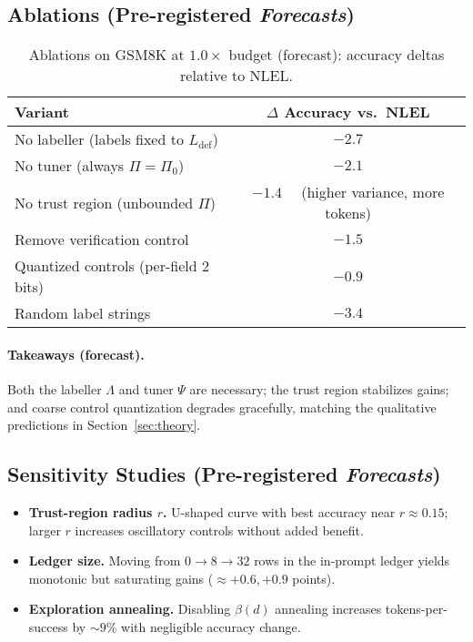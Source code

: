 \documentclass{article}
\theoremstyle{plain}
\theoremstyle{definition}
\theoremstyle{remark}
\begin{document}
\subsection{Ablations (Pre-registered \emph{Forecasts})}

\begin{table*}[t]
\centering
\caption{Ablations on GSM8K at $1.0\times$ budget (forecast): accuracy deltas relative to NLEL.}
\label{tab:ablations-forecast}
\begin{tabular}{lc}
\toprule
Variant & $\Delta$ Accuracy vs.\ NLEL \\
\midrule
No labeller (labels fixed to $L_{\text{def}}$)  & $-2.7$ \\
No tuner (always $\Pi=\Pi_0$)                   & $-2.1$ \\
No trust region (unbounded $\Pi$)               & $-1.4$ \ \ (higher variance, more tokens) \\
Remove verification control                      & $-1.5$ \\
Quantized controls (per-field 2 bits)           & $-0.9$ \\
Random label strings                             & $-3.4$ \\
\bottomrule
\end{tabular}
\end{table*}

\paragraph{Takeaways (forecast).}
Both the labeller $\Lambda$ and tuner $\Psi$ are necessary; the trust region stabilizes gains; and coarse control quantization degrades gracefully, matching the qualitative predictions in Section~\ref{sec:theory}.

\subsection{Sensitivity Studies (Pre-registered \emph{Forecasts})}

\begin{itemize}\setlength{\itemsep}{2pt}
    \item \textbf{Trust-region radius $r$.} U-shaped curve with best accuracy near $r\approx0.15$; larger $r$ increases oscillatory controls without added benefit.
    \item \textbf{Ledger size.} Moving from $0\!\to\!8\!\to\!32$ rows in the in-prompt ledger yields monotonic but saturating gains ($\approx{+}0.6,{+}0.9$ points).
    \item \textbf{Exploration annealing.} Disabling $\beta(d)$ annealing increases tokens-per-success by $\sim9\%$ with negligible accuracy change.
\end{itemize}
\end{document}
